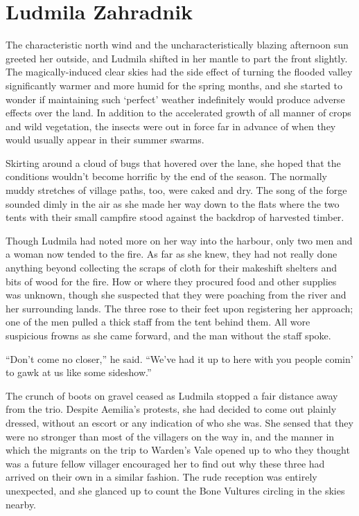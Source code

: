 \chapter{Ludmila Zahradnik}

The characteristic north wind and the uncharacteristically blazing afternoon sun greeted her outside, and Ludmila shifted in her mantle to part the front slightly. The magically-induced clear skies had the side effect of turning the flooded valley significantly warmer and more humid for the spring months, and she started to wonder if maintaining such ‘perfect’ weather indefinitely would produce adverse effects over the land. In addition to the accelerated growth of all manner of crops and wild vegetation, the insects were out in force far in advance of when they would usually appear in their summer swarms.

 

Skirting around a cloud of bugs that hovered over the lane, she hoped that the conditions wouldn’t become horrific by the end of the season. The normally muddy stretches of village paths, too, were caked and dry. The song of the forge sounded dimly in the air as she made her way down to the flats where the two tents with their small campfire stood against the backdrop of harvested timber.

 

Though Ludmila had noted more on her way into the harbour, only two men and a woman now tended to the fire. As far as she knew, they had not really done anything beyond collecting the scraps of cloth for their makeshift shelters and bits of wood for the fire. How or where they procured food and other supplies was unknown, though she suspected that they were poaching from the river and her surrounding lands. The three rose to their feet upon registering her approach; one of the men pulled a thick staff from the tent behind them. All wore suspicious frowns as she came forward, and the man without the staff spoke.

 

“Don’t come no closer,” he said. “We’ve had it up to here with you people comin’ to gawk at us like some sideshow.”

 

The crunch of boots on gravel ceased as Ludmila stopped a fair distance away from the trio. Despite Aemilia’s protests, she had decided to come out plainly dressed, without an escort or any indication of who she was. She sensed that they were no stronger than most of the villagers on the way in, and the manner in which the migrants on the trip to Warden’s Vale opened up to who they thought was a future fellow villager encouraged her to find out why these three had arrived on their own in a similar fashion. The rude reception was entirely unexpected, and she glanced up to count the Bone Vultures circling in the skies nearby.

